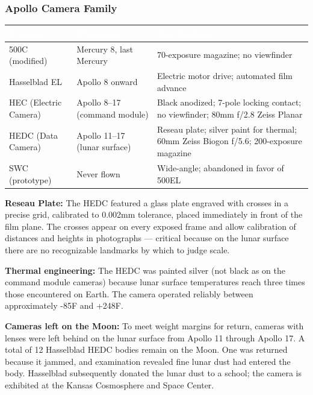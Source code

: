 \documentclass[11pt,letterpaper]{article}
\newcommand{\tableheader}[1]{\textbf{\sffamily\textcolor{white}{#1}}}
\begin{document}
\subsubsection{Apollo Camera Family}

\begin{center}
\begin{tabularx}{\textwidth}{L{2.5cm}L{3cm}X}
\toprule
{}
\tableheader{Camera} & \tableheader{Mission(s)} & \tableheader{Key Features} \\
\midrule
500C (modified) & Mercury 8, last Mercury & 70-exposure magazine; no viewfinder \\
Hasselblad EL & Apollo 8 onward & Electric motor drive; automated film advance \\
HEC (Electric Camera) & Apollo 8--17 (command module) & Black anodized; 7-pole locking contact; no viewfinder; 80mm f/2.8 Zeiss Planar \\
HEDC (Data Camera) & Apollo 11--17 (lunar surface) & Reseau plate; silver paint for thermal; 60mm Zeiss Biogon f/5.6; 200-exposure magazine \\
SWC (prototype) & Never flown & Wide-angle; abandoned in favor of 500EL \\
\bottomrule
\end{tabularx}
\end{center}

\textbf{Reseau Plate:} The HEDC featured a glass plate engraved with crosses in a precise grid, calibrated to 0.002mm tolerance, placed immediately in front of the film plane. The crosses appear on every exposed frame and allow calibration of distances and heights in photographs --- critical because on the lunar surface there are no recognizable landmarks by which to judge scale.

\textbf{Thermal engineering:} The HEDC was painted silver (not black as on the command module cameras) because lunar surface temperatures reach three times those encountered on Earth. The camera operated reliably between approximately -85\textdegree{}F and +248\textdegree{}F.

\textbf{Cameras left on the Moon:} To meet weight margins for return, cameras with lenses were left behind on the lunar surface from Apollo 11 through Apollo 17. A total of 12 Hasselblad HEDC bodies remain on the Moon. One was returned because it jammed, and examination revealed fine lunar dust had entered the body. Hasselblad subsequently donated the lunar dust to a school; the camera is exhibited at the Kansas Cosmosphere and Space Center.
\end{document}
